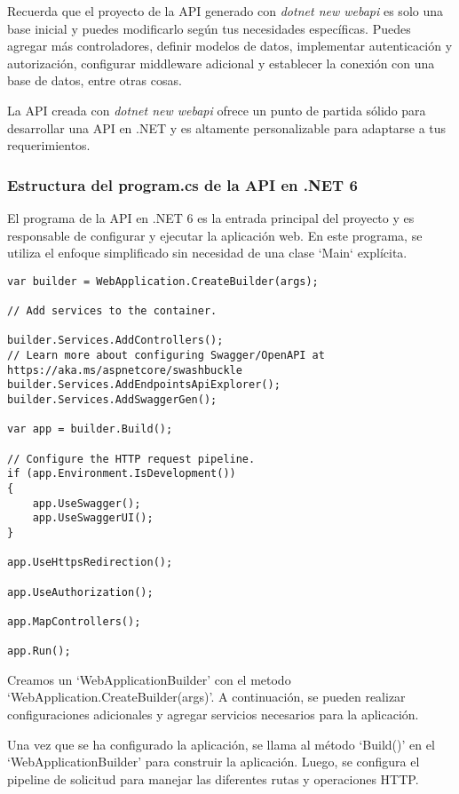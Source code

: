\documentclass[executivepaper]{article}
\begin{document}
Recuerda que el proyecto de la API generado con \emph{dotnet new webapi} es solo una base inicial y puedes modificarlo según tus necesidades específicas. Puedes agregar más controladores, definir modelos de datos, implementar autenticación y autorización, configurar middleware adicional y establecer la conexión con una base de datos, entre otras cosas.

La API creada con \emph{dotnet new webapi} ofrece un punto de partida sólido para desarrollar una API en .NET y es altamente personalizable para adaptarse a tus requerimientos.

\subsubsection*{Estructura del program.cs de la API en .NET 6}

El programa de la API en .NET 6 es la entrada principal del proyecto y es responsable de configurar y ejecutar la aplicación web. En este programa, se utiliza el enfoque simplificado sin necesidad de una clase `Main` explícita.

\begin{lstlisting}[language={[Sharp]C}]
var builder = WebApplication.CreateBuilder(args);

// Add services to the container.

builder.Services.AddControllers();
// Learn more about configuring Swagger/OpenAPI at https://aka.ms/aspnetcore/swashbuckle
builder.Services.AddEndpointsApiExplorer();
builder.Services.AddSwaggerGen();

var app = builder.Build();

// Configure the HTTP request pipeline.
if (app.Environment.IsDevelopment())
{
    app.UseSwagger();
    app.UseSwaggerUI();
}

app.UseHttpsRedirection();

app.UseAuthorization();

app.MapControllers();

app.Run();    
\end{lstlisting}

Creamos un \enquote*{WebApplicationBuilder} con el metodo \enquote*{WebApplication.CreateBuilder(args)}. A continuación, se pueden realizar configuraciones adicionales y agregar servicios necesarios para la aplicación.

Una vez que se ha configurado la aplicación, se llama al método \enquote*{Build()} en el \enquote*{WebApplicationBuilder} para construir la aplicación. Luego, se configura el pipeline de solicitud para manejar las diferentes rutas y operaciones HTTP.
\end{document}
